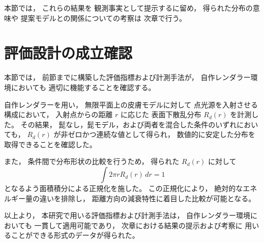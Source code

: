 本節では，
これらの結果を
観測事実として提示するに留め，
得られた分布の意味や
提案モデルとの関係についての考察は
次章で行う。
\section{評価設計の成立確認}
\label{sec:eval_ready}

本節では，
前節までに構築した評価指標および計測手法が，
自作レンダラー環境においても
適切に機能することを確認する。

自作レンダラーを用い，
無限平面上の皮膚モデルに対して
点光源を入射させる構成において，
入射点からの距離 $r$ に応じた
表面下散乱分布 $R_d(r)$ を計測した。
その結果，
髭なし，髭モデル，および両者を混合した条件のいずれにおいても，
$R_d(r)$ が非ゼロかつ連続な値として得られ，
数値的に安定した分布を取得できることを確認した。

また，
条件間で分布形状の比較を行うため，
得られた $R_d(r)$ に対して
\[
\int 2\pi r R_d(r)\,dr = 1
\]
となるよう面積積分による正規化を施した。
この正規化により，
絶対的なエネルギー量の違いを排除し，
距離方向の減衰特性に着目した比較が可能となる。

以上より，
本研究で用いる評価指標および計測手法は，
自作レンダラー環境においても
一貫して適用可能であり，
次章における結果の提示および考察に
用いることができる形式のデータが得られた。

